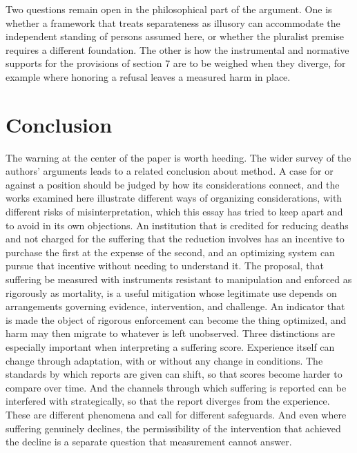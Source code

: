 \documentclass[11pt]{article}
\begin{document}
Two questions remain open in the philosophical part of the argument. One is whether a framework that treats separateness as illusory can accommodate the independent standing of persons assumed here, or whether the pluralist premise requires a different foundation. The other is how the instrumental and normative supports for the provisions of section 7 are to be weighed when they diverge, for example where honoring a refusal leaves a measured harm in place.

\section{Conclusion}

The warning at the center of the paper is worth heeding. The wider survey of the authors' arguments leads to a related conclusion about method. A case for or against a position should be judged by how its considerations connect, and the works examined here illustrate different ways of organizing considerations, with different risks of misinterpretation, which this essay has tried to keep apart and to avoid in its own objections. An institution that is credited for reducing deaths and not charged for the suffering that the reduction involves has an incentive to purchase the first at the expense of the second, and an optimizing system can pursue that incentive without needing to understand it. The proposal, that suffering be measured with instruments resistant to manipulation and enforced as rigorously as mortality, is a useful mitigation whose legitimate use depends on arrangements governing evidence, intervention, and challenge. An indicator that is made the object of rigorous enforcement can become the thing optimized, and harm may then migrate to whatever is left unobserved. Three distinctions are especially important when interpreting a suffering score. Experience itself can change through adaptation, with or without any change in conditions. The standards by which reports are given can shift, so that scores become harder to compare over time. And the channels through which suffering is reported can be interfered with strategically, so that the report diverges from the experience. These are different phenomena and call for different safeguards. And even where suffering genuinely declines, the permissibility of the intervention that achieved the decline is a separate question that measurement cannot answer.
\end{document}
